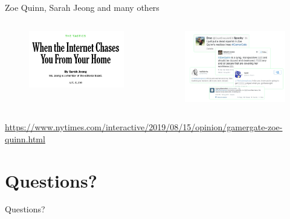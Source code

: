 \documentclass[nobackground,dvipsnames,table]{beamer}
\begin{document}
\begin{frame}{Zoe Quinn, Sarah Jeong and many others}
    \begin{columns}[T]
            \begin{figure}
                \includegraphics[width=\textwidth]{sarah-jeong-nyt-article}
            \end{figure}
            \begin{figure}
                \includegraphics[width=\textwidth]{zoe-quinn-threatening-tweets}
            \end{figure}
    \end{columns}
    
    \tiny
    \url{https://www.nytimes.com/interactive/2019/08/15/opinion/gamergate-zoe-quinn.html}
\end{frame}

\section{Questions?}

\begin{frame}{}
    \thispagestyle{empty}
    Questions?
\end{frame}

\backpage
\end{document}
